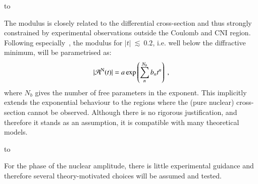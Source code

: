 \vskip3mm
\hbox to

The modulus is closely related to the differential cross-section and thus strongly constrained by experimental observations outside the Coulomb and CNI region. Following especially~\cite{8tev-90m}, the modulus for $|t|~\lesssim~0.2$, i.e. well below the diffractive minimum, will be parametrised as:
\begin{equation}
\label{eq:nuc mod}
| {\cal A}^{\rm N}(t) | = a \exp\left( \sum\limits_{n}^{N_b} b_n t^n \right)\ ,
\end{equation}
where $N_b$ gives the number of free parameters in the exponent. This implicitly extends the exponential behaviour to the regions where the (pure nuclear) cross-section cannot be observed. Although there is no rigorous justification, and therefore it stands as an assumption, it is compatible with many theoretical models.




\vskip3mm
\hbox to

For the phase of the nuclear amplitude, there is little experimental guidance and therefore several theory-motivated choices will be assumed and tested.


